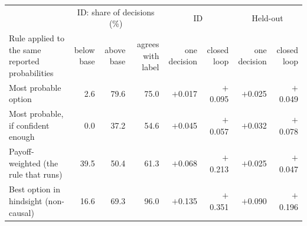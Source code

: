 \begin{tabular}{lrrrrrrr}
\toprule
 & \multicolumn{3}{c}{ID: share of decisions (\%)} & \multicolumn{2}{c}{ID} & \multicolumn{2}{c}{Held-out} \\
Rule applied to the same reported probabilities & below base & above base & agrees with label & one decision & closed loop & one decision & closed loop \\
\midrule
Most probable option & 2.6 & 79.6 & 75.0 & $+$0.017 & $+$0.095 & $+$0.025 & $+$0.049 \\
Most probable, if confident enough & 0.0 & 37.2 & 54.6 & $+$0.045 & $+$0.057 & $+$0.032 & $+$0.078 \\
Payoff-weighted (the rule that runs) & 39.5 & 50.4 & 61.3 & $+$0.068 & $+$0.213 & $+$0.025 & $+$0.047 \\
Best option in hindsight (non-causal) & 16.6 & 69.3 & 96.0 & $+$0.135 & $+$0.351 & $+$0.090 & $+$0.196 \\
\bottomrule
\end{tabular}
